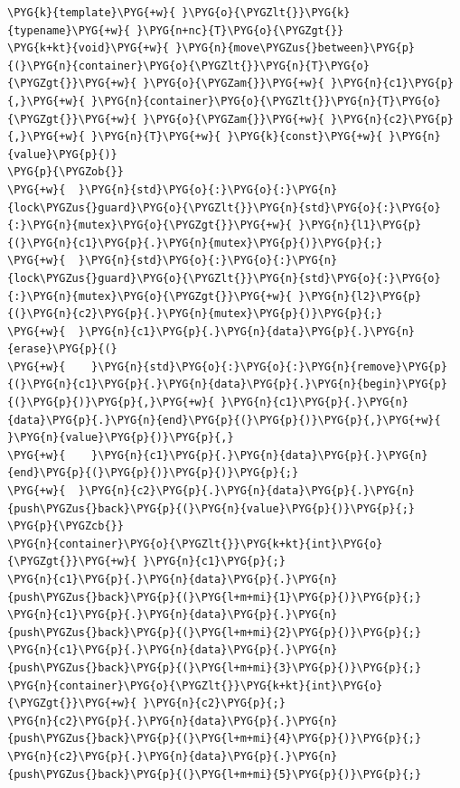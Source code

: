 \begin{codeblockbg}
\begin{Verbatim}[commandchars=\\\{\},breaklines=true,breakanywhere=true,fontsize=\codefont,xleftmargin=17bp]
\PYG{k}{template}\PYG{+w}{ }\PYG{o}{\PYGZlt{}}\PYG{k}{typename}\PYG{+w}{ }\PYG{n+nc}{T}\PYG{o}{\PYGZgt{}}
\PYG{k+kt}{void}\PYG{+w}{ }\PYG{n}{move\PYGZus{}between}\PYG{p}{(}\PYG{n}{container}\PYG{o}{\PYGZlt{}}\PYG{n}{T}\PYG{o}{\PYGZgt{}}\PYG{+w}{ }\PYG{o}{\PYGZam{}}\PYG{+w}{ }\PYG{n}{c1}\PYG{p}{,}\PYG{+w}{ }\PYG{n}{container}\PYG{o}{\PYGZlt{}}\PYG{n}{T}\PYG{o}{\PYGZgt{}}\PYG{+w}{ }\PYG{o}{\PYGZam{}}\PYG{+w}{ }\PYG{n}{c2}\PYG{p}{,}\PYG{+w}{ }\PYG{n}{T}\PYG{+w}{ }\PYG{k}{const}\PYG{+w}{ }\PYG{n}{value}\PYG{p}{)}
\PYG{p}{\PYGZob{}}
\PYG{+w}{  }\PYG{n}{std}\PYG{o}{:}\PYG{o}{:}\PYG{n}{lock\PYGZus{}guard}\PYG{o}{\PYGZlt{}}\PYG{n}{std}\PYG{o}{:}\PYG{o}{:}\PYG{n}{mutex}\PYG{o}{\PYGZgt{}}\PYG{+w}{ }\PYG{n}{l1}\PYG{p}{(}\PYG{n}{c1}\PYG{p}{.}\PYG{n}{mutex}\PYG{p}{)}\PYG{p}{;}
\PYG{+w}{  }\PYG{n}{std}\PYG{o}{:}\PYG{o}{:}\PYG{n}{lock\PYGZus{}guard}\PYG{o}{\PYGZlt{}}\PYG{n}{std}\PYG{o}{:}\PYG{o}{:}\PYG{n}{mutex}\PYG{o}{\PYGZgt{}}\PYG{+w}{ }\PYG{n}{l2}\PYG{p}{(}\PYG{n}{c2}\PYG{p}{.}\PYG{n}{mutex}\PYG{p}{)}\PYG{p}{;}
\PYG{+w}{  }\PYG{n}{c1}\PYG{p}{.}\PYG{n}{data}\PYG{p}{.}\PYG{n}{erase}\PYG{p}{(}
\PYG{+w}{    }\PYG{n}{std}\PYG{o}{:}\PYG{o}{:}\PYG{n}{remove}\PYG{p}{(}\PYG{n}{c1}\PYG{p}{.}\PYG{n}{data}\PYG{p}{.}\PYG{n}{begin}\PYG{p}{(}\PYG{p}{)}\PYG{p}{,}\PYG{+w}{ }\PYG{n}{c1}\PYG{p}{.}\PYG{n}{data}\PYG{p}{.}\PYG{n}{end}\PYG{p}{(}\PYG{p}{)}\PYG{p}{,}\PYG{+w}{ }\PYG{n}{value}\PYG{p}{)}\PYG{p}{,}
\PYG{+w}{    }\PYG{n}{c1}\PYG{p}{.}\PYG{n}{data}\PYG{p}{.}\PYG{n}{end}\PYG{p}{(}\PYG{p}{)}\PYG{p}{)}\PYG{p}{;}
\PYG{+w}{  }\PYG{n}{c2}\PYG{p}{.}\PYG{n}{data}\PYG{p}{.}\PYG{n}{push\PYGZus{}back}\PYG{p}{(}\PYG{n}{value}\PYG{p}{)}\PYG{p}{;}
\PYG{p}{\PYGZcb{}}
\PYG{n}{container}\PYG{o}{\PYGZlt{}}\PYG{k+kt}{int}\PYG{o}{\PYGZgt{}}\PYG{+w}{ }\PYG{n}{c1}\PYG{p}{;}
\PYG{n}{c1}\PYG{p}{.}\PYG{n}{data}\PYG{p}{.}\PYG{n}{push\PYGZus{}back}\PYG{p}{(}\PYG{l+m+mi}{1}\PYG{p}{)}\PYG{p}{;}
\PYG{n}{c1}\PYG{p}{.}\PYG{n}{data}\PYG{p}{.}\PYG{n}{push\PYGZus{}back}\PYG{p}{(}\PYG{l+m+mi}{2}\PYG{p}{)}\PYG{p}{;}
\PYG{n}{c1}\PYG{p}{.}\PYG{n}{data}\PYG{p}{.}\PYG{n}{push\PYGZus{}back}\PYG{p}{(}\PYG{l+m+mi}{3}\PYG{p}{)}\PYG{p}{;}
\PYG{n}{container}\PYG{o}{\PYGZlt{}}\PYG{k+kt}{int}\PYG{o}{\PYGZgt{}}\PYG{+w}{ }\PYG{n}{c2}\PYG{p}{;}
\PYG{n}{c2}\PYG{p}{.}\PYG{n}{data}\PYG{p}{.}\PYG{n}{push\PYGZus{}back}\PYG{p}{(}\PYG{l+m+mi}{4}\PYG{p}{)}\PYG{p}{;}
\PYG{n}{c2}\PYG{p}{.}\PYG{n}{data}\PYG{p}{.}\PYG{n}{push\PYGZus{}back}\PYG{p}{(}\PYG{l+m+mi}{5}\PYG{p}{)}\PYG{p}{;}

\end{Verbatim}
\end{codeblockbg}
